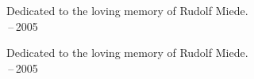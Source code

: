 
\thispagestyle{empty}



\vspace*{3cm}

\begin{center}
Dedicated to the loving memory of Rudolf Miede. \\ \,--\,2005
\end{center}

\vspace*{3cm}

\begin{center}
Dedicated to the loving memory of Rudolf Miede. \\ \,--\,2005
\end{center}
